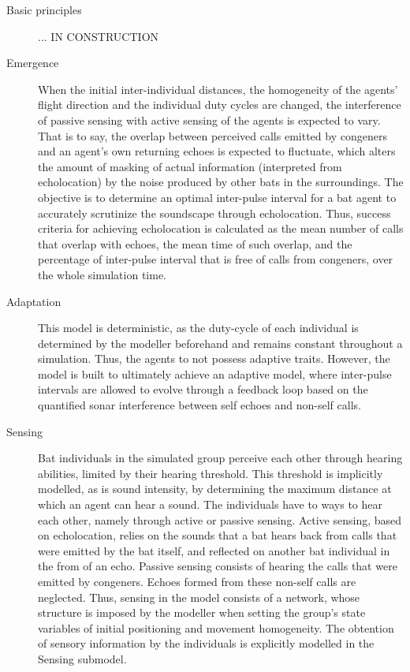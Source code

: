 \documentclass[12pt]{article}
\begin{document}
\begin{description}

\item [Basic principles] ... IN CONSTRUCTION

\item [Emergence] When the initial inter-individual distances, the homogeneity of the agents' flight direction and the individual duty cycles are changed, the interference of passive sensing with active sensing of the agents is expected to vary. That is to say, the overlap between perceived calls emitted by congeners and an agent's own returning echoes is expected to fluctuate, which alters the amount of masking of actual information (interpreted from echolocation) by the noise produced by other bats in the surroundings.
The objective is to determine an optimal inter-pulse interval for a bat agent to accurately scrutinize the soundscape through echolocation. Thus, success criteria for achieving echolocation is calculated as the mean number of calls that overlap with echoes, the mean time of such overlap, and the percentage of inter-pulse interval that is free of calls from congeners, over the whole simulation time.  

\item [Adaptation] This model is deterministic, as the duty-cycle of each individual is determined by the modeller beforehand and remains constant throughout a simulation. Thus, the agents to not possess adaptive traits. However, the model is built to ultimately achieve an adaptive model, where inter-pulse intervals are allowed to evolve through a feedback loop based on the quantified sonar interference between self echoes and non-self calls.

\item [Sensing] Bat individuals in the simulated group perceive each other through hearing abilities, limited by their hearing threshold. This threshold is implicitly modelled, as is sound intensity, by determining the maximum distance at which an agent can hear a sound. The individuals have to ways to hear each other, namely through active or passive sensing. Active sensing, based on echolocation, relies on the sounds that a bat hears back from calls that were emitted by the bat itself, and reflected on another bat individual in the from of an echo. Passive sensing consists of hearing the calls that were emitted by congeners. Echoes formed from these non-self calls are neglected. Thus, sensing in the model consists of a network, whose structure is imposed by the modeller when setting the group's state variables of initial positioning and movement homogeneity. The obtention of sensory information by the individuals is explicitly modelled in the Sensing submodel. 


\end{description}
\end{document}
